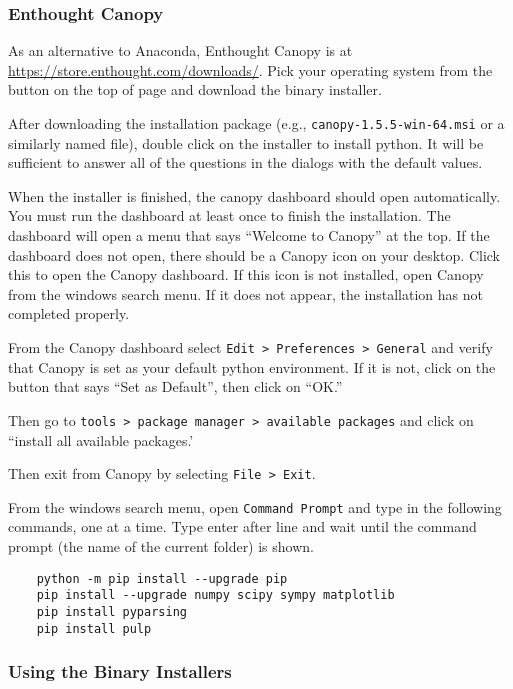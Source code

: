\clearpage 

\subsubsection{Enthought Canopy}

As an alternative to Anaconda, Enthought Canopy is at \href{https://store.enthought.com/downloads/}{https://store.enthought.com/downloads/}. Pick your operating system from the button on the top of page and download the binary installer. 

After downloading the installation package (e.g., {\tt canopy-1.5.5-win-64.msi} or a similarly named file), double click on the installer to install python. It will be sufficient to answer all of the questions in the dialogs with the default values. 

When the installer is finished, the canopy dashboard should open automatically. You must run the dashboard at least once to finish the installation. The dashboard will open a menu that says ``Welcome to Canopy'' at the top. If the dashboard does not open, there should be a Canopy icon on your desktop. Click this to open the Canopy dashboard. If this icon is not installed, open Canopy from the windows search menu. If it does not appear, the installation has not completed properly.

From the Canopy dashboard select {\tt Edit > Preferences > General} and verify that Canopy is set as your default python environment. If it is not, click on the button that says ``Set as Default'', then click on ``OK.'' 

Then go to {\tt tools > package manager > available packages} and click on ``install all available packages.'

Then exit from Canopy by selecting {\tt File > Exit}. 

From the windows search menu, open {\tt Command Prompt} and type in the following commands, one at a time. Type enter after line and wait until the command prompt (the name of the current folder)  is shown. 

\begin{verbatim}
    python -m pip install --upgrade pip
    pip install --upgrade numpy scipy sympy matplotlib
    pip install pyparsing
    pip install pulp
\end{verbatim}

\subsubsection{Using the Binary Installers}

